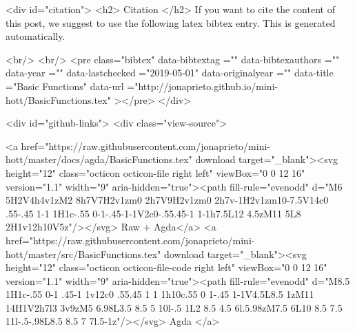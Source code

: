   
  <div id="citation">
  <h2> Citation </h2>
  If you want to cite the content of this post,
  we suggest to use the following latex bibtex entry.
  This is generated automatically.

  <br/>
  <br/>
  <pre class="bibtex"
       data-bibtextag =""
       data-bibtexauthors =""
       data-year =""
       data-lastchecked ="2019-05-01"
       data-originalyear =""
       data-title ="Basic Functions"
       data-url ="http://jonaprieto.github.io/mini-hott/BasicFunctions.tex"
  ></pre>
  </div>
  

  <div id="github-links">
    <div class="view-source">
      
        <a href="https://raw.githubusercontent.com/jonaprieto/mini-hott/master/docs/agda/BasicFunctions.tex" download target="_blank"><svg height="12" class="octicon octicon-file right left" viewBox="0 0 12 16" version="1.1" width="9" aria-hidden="true"><path fill-rule="evenodd" d="M6 5H2V4h4v1zM2 8h7V7H2v1zm0 2h7V9H2v1zm0 2h7v-1H2v1zm10-7.5V14c0 .55-.45 1-1 1H1c-.55 0-1-.45-1-1V2c0-.55.45-1 1-1h7.5L12 4.5zM11 5L8 2H1v12h10V5z"/></svg> Raw + Agda</a>
        <a href="https://raw.githubusercontent.com/jonaprieto/mini-hott/master/src/BasicFunctions.tex" download target="_blank"><svg height="12" class="octicon octicon-file-code right left" viewBox="0 0 12 16" version="1.1" width="9" aria-hidden="true"><path fill-rule="evenodd" d="M8.5 1H1c-.55 0-1 .45-1 1v12c0 .55.45 1 1 1h10c.55 0 1-.45 1-1V4.5L8.5 1zM11 14H1V2h7l3 3v9zM5 6.98L3.5 8.5 5 10l-.5 1L2 8.5 4.5 6l.5.98zM7.5 6L10 8.5 7.5 11l-.5-.98L8.5 8.5 7 7l.5-1z"/></svg> Agda </a>
      
